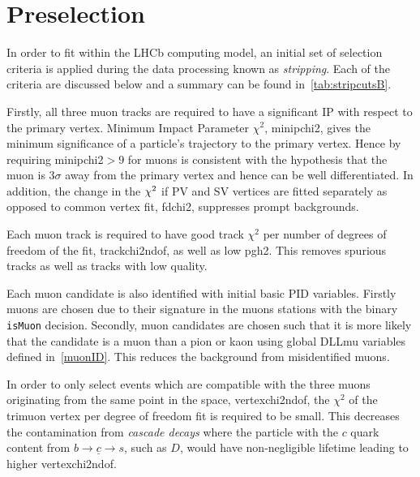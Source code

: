 \section{Preselection}%
\label{preselection}

In order to fit within the LHCb computing model, an initial set of selection criteria is applied during the data processing known as \textit{stripping}. Each of the criteria are discussed below and a summary can be found in~\autoref{tab:stripcutsB}.


Firstly, all three muon tracks are required to have a significant \gls{IP} with respect to the primary vertex. Minimum Impact Parameter $\chi^{2}$, \gls{minipchi2}, gives the minimum significance of a particle's trajectory to the primary vertex. Hence by requiring \gls{minipchi2}$>9$ for muons is consistent with the hypothesis that the muon is $3\sigma$ away from the primary vertex and hence can be well differentiated. In addition, the change in the $\chi^2$ if \gls{PV} and \gls{SV} vertices are fitted separately as opposed to common vertex fit, \gls{fdchi2}, suppresses prompt backgrounds. 

Each muon track is required to have good track $\chi^{2}$ per number of degrees of freedom of the fit, \gls{trackchi2ndof}, as well as low \gls{pgh2}. This removes spurious tracks as well as tracks with low quality.

Each muon candidate is also identified with initial basic \gls{PID} variables. Firstly muons are chosen due to their signature in the muons stations with the binary \texttt{isMuon} decision. Secondly, muon candidates are chosen such that it is more likely that the candidate is a muon than a pion or kaon using global DLLmu variables defined in~\autoref{muonID}. This reduces the background from misidentified muons.

In order to only select events which are compatible with the three muons originating from the same point in the space, \gls{vertexchi2ndof}, the $\chi^{2}$ of the trimuon vertex per degree of freedom fit is required to be small. This decreases the contamination from \textit{cascade decays} where the particle with the $c$ quark content from $b \rightarrow \underline{c} \rightarrow s$, such as $D$, would have non-negligible lifetime leading to higher \gls{vertexchi2ndof}. 

